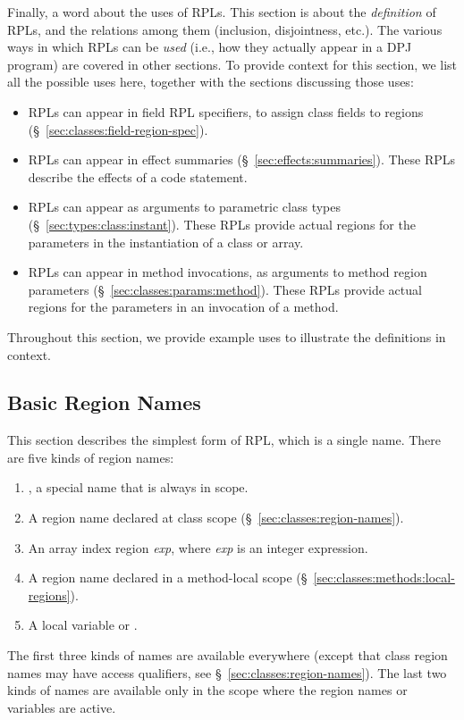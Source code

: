 Finally, a word about the uses of RPLs.  This section is about the
\emph{definition} of RPLs, and the relations among them (inclusion,
disjointness, etc.).  The various ways in which RPLs can be
\emph{used} (i.e., how they actually appear in a DPJ program) are
covered in other sections.  To provide context for this section, we
list all the possible uses here, together with the sections discussing
those uses:
%
\begin{itemize}
%
\item RPLs can appear in field RPL specifiers, to assign class fields
  to regions (\S~\ref{sec:classes:field-region-spec}).
%
\item RPLs can appear in effect summaries
  (\S~\ref{sec:effects:summaries}).  These RPLs describe the effects
  of a code statement.
%
\item RPLs can appear as arguments to parametric class types
  (\S~\ref{sec:types:class:instant}).  These RPLs provide actual
  regions for the parameters in the instantiation of a class or array.
%
\item RPLs can appear in method invocations, as arguments to method
  region parameters (\S~\ref{sec:classes:params:method}).  These RPLs
  provide actual regions for the parameters in an invocation of a
  method.
%
\end{itemize}
%
Throughout this section, we provide example uses to illustrate the
definitions in context.

\subsection{Basic Region Names%
\label{sec:rpls:basic}}

This section describes the simplest form of RPL, which is a single
name.  There are five kinds of region names: 
%
\begin{enumerate}
%
\item
{}, a special name that is always in scope.
%
\item A region name declared at class scope
  (\S~\ref{sec:classes:region-names}).
%
\item An array index region \kwd{[}\emph{exp}\kwd{]}, where \emph{exp}
  is an integer expression.
%
\item A region name declared in a method-local scope
  (\S~\ref{sec:classes:methods:local-regions}).
%
\item A  local variable or .  
%
\end{enumerate}
%
The first three kinds of names are available everywhere (except that
class region names may have access qualifiers, see
\S~\ref{sec:classes:region-names}).  The last two kinds of names are
available only in the scope where the region names or variables
are active.

